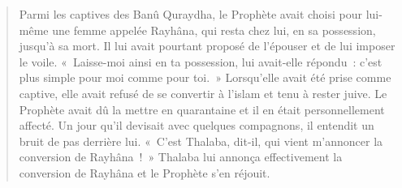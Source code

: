 \begin{quote}
    
{Parmi les captives des Banû Quraydha, le Prophète avait choisi
pour lui-même une femme appelée Rayhâna, qui resta chez lui, en sa
possession, jusqu'à sa mort. Il lui avait pourtant proposé de l'épouser
et de lui imposer le voile. «~Laisse-moi ainsi en ta possession, lui
avait-elle répondu~: c'est plus simple pour moi comme pour toi.~»
Lorsqu'elle avait été prise comme captive, elle avait refusé de se
convertir à l'islam et tenu à rester juive. Le Prophète avait dû la
mettre en quarantaine et il en était personnellement affecté. Un jour
qu'il devisait avec quelques compagnons, il entendit un bruit de pas
derrière lui. «~C'est Thalaba, dit-il, qui vient m'annoncer la
conversion de Rayhâna~!~» Thalaba lui annonça effectivement la
conversion de Rayhâna et le Prophète s'en réjouit.}

\end{quote}

